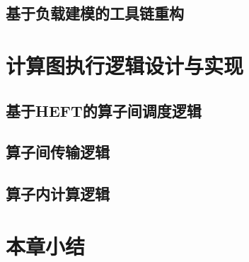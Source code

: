   \subsection{基于负载建模的工具链重构}\label{subsubsec:toolchain_refractor}
    
\section{计算图执行逻辑设计与实现}\label{subsec:task_split_strategy_impl}
    \subsection{基于HEFT的算子间调度逻辑}\label{subsec:HEFT_based_scheduling_logic_impl}
    \subsection{算子间传输逻辑}\label{subsec:overall_logic_impl}
    \subsection{算子内计算逻辑}\label{subsec:overall_logic_impl}
\section{本章小结}\label{sec:chap3_summary}